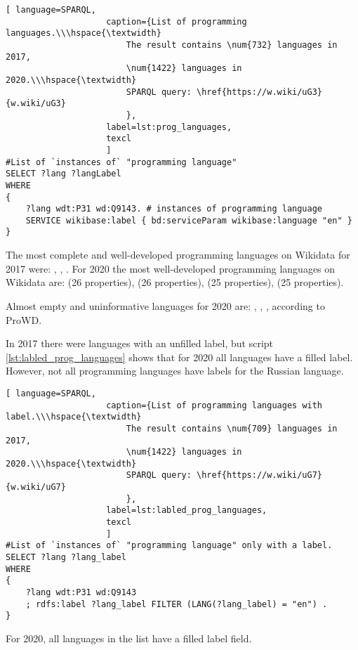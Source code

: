 \begin{lstlisting}[ language=SPARQL, 
                    caption={List of programming languages.\\\hspace{\textwidth}
                        The result contains \num{732} languages in 2017, 
                        \num{1422} languages in 2020.\\\hspace{\textwidth}
                        SPARQL query: \href{https://w.wiki/uG3}{w.wiki/uG3}
                        },
                    label=lst:prog_languages,
                    texcl 
                    ]
#List of `instances of` "programming language" 
SELECT ?lang ?langLabel
WHERE
{
    ?lang wdt:P31 wd:Q9143. # instances of programming language
    SERVICE wikibase:label { bd:serviceParam wikibase:language "en" }
}
\end{lstlisting}%

The most complete and well-developed programming languages on Wikidata for 2017 were: , , . For 2020 the most well-developed programming languages on Wikidata are:  (26 properties),  (26 properties),  (25 properties),  (25 properties).

Almost empty and uninformative languages for 2020 are: , , ,  according to ProWD\cite{prowd_langs}.

In 2017 there were languages with an unfilled label, but script \ref{lst:labled_prog_languages} shows that for 2020 all languages have a filled label. However, not all programming languages have labels for the Russian language.

\begin{lstlisting}[ language=SPARQL, 
                    caption={List of programming languages with label.\\\hspace{\textwidth}
                        The result contains \num{709} languages in 2017, 
                        \num{1422} languages in 2020.\\\hspace{\textwidth}
                        SPARQL query: \href{https://w.wiki/uG7}{w.wiki/uG7}
                        },
                    label=lst:labled_prog_languages,
                    texcl 
                    ]
#List of `instances of` "programming language" only with a label.
SELECT ?lang ?lang_label
WHERE
{
    ?lang wdt:P31 wd:Q9143
    ; rdfs:label ?lang_label FILTER (LANG(?lang_label) = "en") . 
}
\end{lstlisting}%
For 2020, all languages in the list have a filled label field.

